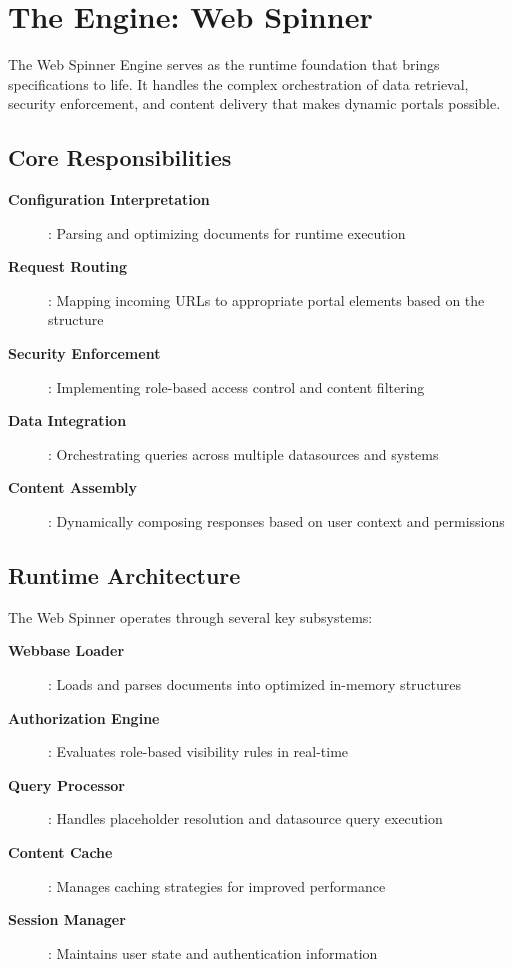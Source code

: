 \section{The Engine: Web Spinner}
\label{sec:engine-spinner}

The Web Spinner Engine serves as the runtime foundation that brings \wbdl{} specifications to life. It handles the complex orchestration of data retrieval, security enforcement, and content delivery that makes dynamic portals possible.

\subsection{Core Responsibilities}

\begin{description}
\item[\textbf{Configuration Interpretation}]: Parsing and optimizing \wbdl{} documents for runtime execution
\item[\textbf{Request Routing}]: Mapping incoming URLs to appropriate portal elements based on the \webbase{} structure
\item[\textbf{Security Enforcement}]: Implementing role-based access control and content filtering
\item[\textbf{Data Integration}]: Orchestrating queries across multiple datasources and systems
\item[\textbf{Content Assembly}]: Dynamically composing responses based on user context and permissions
\end{description}

\subsection{Runtime Architecture}

The Web Spinner operates through several key subsystems:

\begin{description}
\item[\textbf{Webbase Loader}]: Loads and parses \wbdl{} documents into optimized in-memory structures
\item[\textbf{Authorization Engine}]: Evaluates role-based visibility rules in real-time
\item[\textbf{Query Processor}]: Handles \wbpl{} placeholder resolution and datasource query execution
\item[\textbf{Content Cache}]: Manages caching strategies for improved performance
\item[\textbf{Session Manager}]: Maintains user state and authentication information
\end{description}

